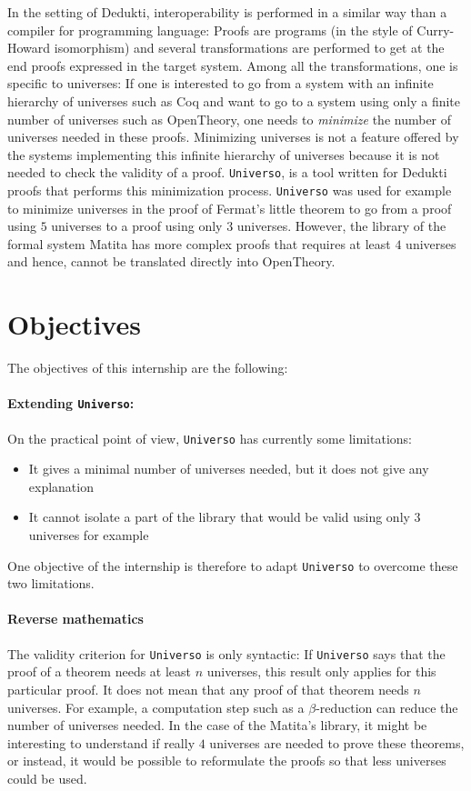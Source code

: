 \documentclass{article}
\newcommand{\universo}{\texttt{Universo}}
\begin{document}
In the setting of Dedukti, interoperability is performed in a similar way than a compiler for programming language: Proofs are programs (in the style of Curry-Howard isomorphism) and several transformations are performed to get at the end proofs expressed in the target system. Among all the transformations, one is specific to universes: If one is interested to go from a system with an infinite hierarchy of universes such as Coq and want to go to a system using only a finite number of universes such as OpenTheory, one needs to \textit{minimize} the number of universes needed in these proofs. Minimizing universes is not a feature offered by the systems implementing this infinite hierarchy of universes because it is not needed to check the validity of a proof. \universo{}, is a tool written for Dedukti proofs that performs this minimization process. \universo{} was used for example to minimize universes in the proof of Fermat's little theorem to go from a proof using \(5\) universes to a proof using only \(3\) universes. However, the library of the formal system Matita has more complex proofs that requires at least \(4\) universes and hence, cannot be translated directly into OpenTheory.

\section{Objectives}

The objectives of this internship are the following:
\paragraph{Extending \universo{}:}
On the practical point of view, \universo{} has currently some limitations:
\begin{itemize}
\item It gives a minimal number of universes needed, but it does not give any explanation
\item It cannot isolate a part of the library that would be valid using only \(3\) universes for example
\end{itemize}

One objective of the internship is therefore to adapt \universo{} to overcome these two limitations.

\paragraph{Reverse mathematics}

The validity criterion for \universo{} is only syntactic: If \universo{} says that the proof of a theorem needs at least \(n\) universes, this result only applies for this particular proof. It does not mean that any proof of that theorem needs \(n\) universes. For example, a computation step such as a \(\beta\)-reduction can reduce the number of universes needed. In the case of the Matita's library, it might be interesting to understand if really \(4\) universes are needed to prove these theorems, or instead, it would be possible to reformulate the proofs so that less universes could be used.
\end{document}
